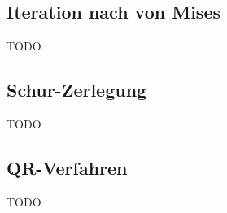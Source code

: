 \subsection{Iteration nach von Mises}
TODO

\subsection{Schur-Zerlegung}
TODO

\subsection{QR-Verfahren}
TODO

